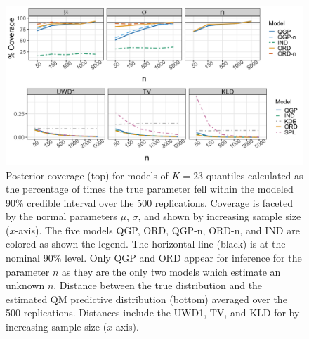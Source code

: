 \documentclass[preprint,12pt,authoryear]{elsarticle}
\newcommand{\1}[1]{\mathds{1}\left[#1\right]}
\begin{document}
\begin{figure}[hbt!]
  \centering
  \includegraphics[width=1\linewidth]{Images/normal_cover_dist.png}
\caption{Posterior coverage (top) for models of $K = 23$ quantiles
calculated as the percentage of times the 
true parameter fell within the modeled 90\% credible interval over the 500 
replications. Coverage is faceted by the normal parameters $\mu$, $\sigma$,
and shown by increasing sample size 
($x$-axis). The five models QGP, ORD, QGP-n, ORD-n, and IND are colored as 
shown the legend. The horizontal line (black) is at the nominal 90\% level. 
Only QGP and ORD appear for inference for the parameter $n$ as they are the 
only two models which 
estimate an unknown $n$.
Distance between the true distribution and the estimated QM predictive 
distribution (bottom) averaged over the 500 replications. Distances include the 
UWD1, TV, and KLD for by increasing sample 
size ($x$-axis).}
\label{fig:normal_cov_dists}
\end{figure}
\end{document}
